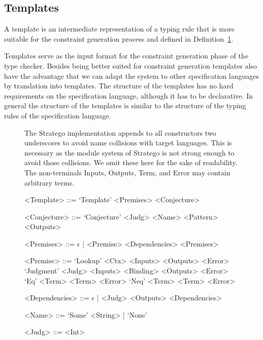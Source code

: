 \subsection{Templates}
A template is an intermediate representation of a typing rule that is
more suitable for the constraint generation process and defined in
Definition~\ref{def:template}.

Templates serve as the input format for the constraint generation
phase of the type checker. Besides being better suited for constraint
generation templates also have the advantage that we can adapt the
system to other specification languages by translation into
templates. The structure of the templates has no hard requirements on
the specification language, although it has to be declarative. In
general the structure of the templates is similar to the structure of
the typing rules of the specification language.

\begin{figure}
  \begin{definition} The Stratego implementation appends to all
    constructors two underscores to avoid name collisions with target
    languages. This is necessary as the module system of Stratego is
    not strong enough to avoid those collisions. We omit these here
    for the sake of readability. The non-terminals Inputs, Outputs,
    Term, and Error may contain arbitrary terms.
  \begin{grammar}
    <Template> ::= `Template' <Premises> <Conjecture>

    <Conjecture> ::= `Conjecture' <Judg> <Name> <Pattern> <Outputs>

    <Premises> ::= $\epsilon$ | <Premise> <Dependencies> <Premises>

    <Premise> ::= `Lookup' <Ctx> <Inputs> <Outputs> <Error>
    \alt `Judgment' <Judg> <Inputs> <Binding> <Outputs> <Error>
    \alt `Eq' <Term> <Term> <Error>
    \alt `Neq' <Term> <Term> <Error>

    <Dependencies> ::= $\epsilon$ | <Judg> <Outputs> <Dependencies>

    <Name> ::= `Some' <String> | `None'

    <Judg> ::= <Int>
  \end{grammar}
\label{def:template}
\end{definition}
\end{figure}


